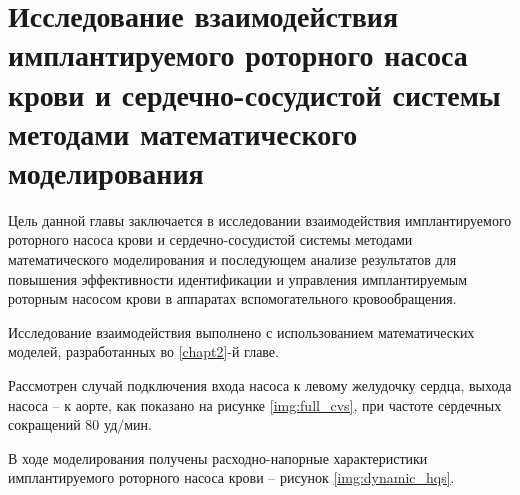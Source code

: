 \chapter{Исследование взаимодействия имплантируемого роторного насоса крови и сердечно-сосудистой системы методами математического моделирования} \label{chapt3}

Цель данной главы заключается в исследовании взаимодействия имплантируемого роторного насоса крови и сердечно-сосудистой системы методами математического моделирования и последующем анализе результатов для повышения эффективности идентификации и управления имплантируемым роторным насосом крови в аппаратах вспомогательного кровообращения. 

Исследование взаимодействия выполнено с использованием математических моделей, разработанных во \ref{chapt2}-й главе.





Рассмотрен случай подключения входа насоса к левому желудочку сердца, выхода насоса -- к аорте, как показано на рисунке \ref{img:full_cvs}, при частоте сердечных сокращений 80 уд/мин.

В ходе моделирования получены расходно-напорные характеристики имплантируемого роторного насоса крови -- рисунок \ref{img:dynamic_hqs}. 

